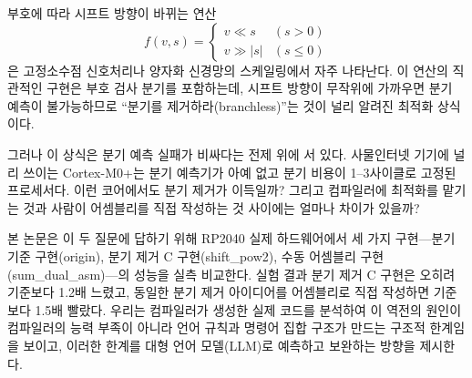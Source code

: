 부호에 따라 시프트 방향이 바뀌는 연산
\begin{equation}
f(v, s) = \begin{cases} v \ll s & (s > 0) \\ v \gg |s| & (s \le 0) \end{cases}
\label{eq:shift}
\end{equation}
은 고정소수점 신호처리나 양자화 신경망의 스케일링에서 자주 나타난다. 이 연산의 직관적인
구현은 부호 검사 분기를 포함하는데, 시프트 방향이 무작위에 가까우면 분기 예측이 불가능하므로
``분기를 제거하라(branchless)''는 것이 널리 알려진 최적화 상식이다\cite{hennessy,shiftop}.

그러나 이 상식은 분기 예측 실패가 비싸다는 전제 위에 서 있다. 사물인터넷 기기에 널리 쓰이는
Cortex-M0+\cite{m0plus}는 분기 예측기가 아예 없고 분기 비용이 1--3사이클로 고정된
프로세서다. 이런 코어에서도 분기 제거가 이득일까? 그리고 컴파일러에 최적화를 맡기는 것과
사람이 어셈블리를 직접 작성하는 것 사이에는 얼마나 차이가 있을까?

본 논문은 이 두 질문에 답하기 위해 RP2040 실제 하드웨어에서 세 가지 구현---분기 기준
구현(origin), 분기 제거 C 구현(shift\_pow2), 수동 어셈블리 구현(sum\_dual\_asm)---의 성능을
실측 비교한다. 실험 결과 분기 제거 C 구현은 오히려 기준보다 1.2배 느렸고, 동일한 분기 제거
아이디어를 어셈블리로 직접 작성하면 기준보다 1.5배 빨랐다. 우리는 컴파일러가 생성한 실제
코드를 분석하여 이 역전의 원인이 컴파일러의 능력 부족이 아니라 언어 규칙과 명령어 집합
구조가 만드는 구조적 한계임을 보이고, 이러한 한계를 대형 언어 모델(LLM)로 예측하고 보완하는
방향을 제시한다.
